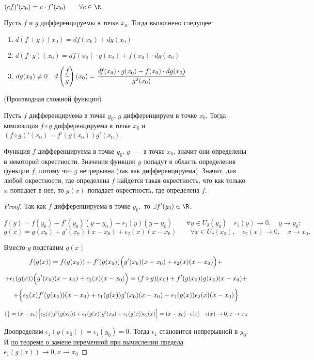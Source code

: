 \begin{corollary}
	$ (cf)'(x_{0}) = c\cdot f'(x_{0}) \quad \quad \forall c \in \R
	$
\end{corollary}
\begin{corollary}
	Пусть $f$ и $g$ дифференцируемы в точке $x_{0}$. Тогда выполнено следущее:
	\begin{enumerate}
		\item $  d(f \pm g)(x_{0}) = df(x_{0}) \pm dg({x_{0}}) $
		\item  $ d(f \cdot g)(x_{0}) = df(x_{0}) \cdot g({x_{0}}) + f(x_{0}) \cdot dg({x_{0}})$
		\item $dg(x_{0}) \neq 0 \quad d\left(\cfrac{f}{g}\right) (x_{0}) = \cfrac{df(x_{0}) \cdot g({x_{0}}) - f(x_{0}) \cdot dg({x_{0}})}{g^{2}(x_{0})}$
	\end{enumerate}
\end{corollary}
\begin{theorem}
	\hypertarget{thrm5.10}{(Производная сложной функции)} Пусть $f$ дифференцируема в точке $y_{0}$, $g$ дифференцируем в точке $x_{0}$. Тогда композиция $f \circ g$ дифференцируема в точке $x_{0} $ и $(f\circ g)'(x_{0}) = f'(g(x_{0})) g'(x_{0})$.
\end{theorem}
\begin{note}
	Функция $f$ дифференцируема в точке $y_{0}$, $g$~---~в точке $x_{0}$, значит они определены в некоторой окрестности. Значения функции $g$ попадут в область определения функции $f$, потому что $g$ непрерывна (так как дифференцируема). Значит, для любой окрестности, где определена $f$ найдется такая окрестность, что как только $x$ попадает в нее, то $g(x)$ попадает окрестность, где определена $f$.
\end{note}
\begin{proof}
	Так как $f$ дифференцируема в точке $y_{0},$ то $\exists f'(y_{0}) \in \R$.
	
	$$f(y) = f(y_{0}) + f'(y_{0})(y-y_{0}) + \epsilon_{1}(y)(y-y_{0}) \quad  \quad   \forall y \in U_{\delta}(y_{0}) \quad \epsilon_{1}(y) \to 0,\quad y\to y_{0};$$
	$$g(x) = g(x_{0}) + g'(x_{0})(x-x_{0}) + \epsilon_{2}(x)(x-x_{0})  \quad \quad  \forall x \in U_{\delta}(x_{0}),\quad \epsilon_{2}(x) \to 0,\quad  x\to x_{0}.$$
	
	Вместо $y$ подставим $g(x)$
	$$
	f(g(x)) = f(g(x_{0})) + f'(g(x_{0}))\Bigl( g'(x_{0})(x-x_{0}) + \epsilon_{2}(x)(x-x_{0})\Bigr) +  $$
	$$
	+ \epsilon_{1}(g(x))\Bigl(g'(x_{0})(x-x_{0}) + \epsilon_{2}(x)(x-x_{0})\Bigr) = (f\circ g)(x_{0}) + f'(g(x_{0}))g(x_{0})(x-x_{0}) + $$
	$$+ \Bigl\{ \epsilon_{2}(x)f'(g(x_{0}))(x-x_{0}) + \epsilon_{1}(g(x))g'(x_{0})(x-x_{0}) + \epsilon_{1}(g(x))\epsilon_{2}(x)(x-x_{0}) \Bigr\}$$
	
	$$
	\{\} = (x-x_{0})\Bigl[\epsilon_{2}(x)f'(g(x_{0})) + \epsilon_{1}(g(x))g'(x_{0}) + \epsilon_{1}(g(x))\epsilon_{2}(x) \Bigr] = (x - x_{0}) \cdot \epsilon(x) \quad \epsilon(x) \to 0, x\to x_{0}
	$$
	
	Доопределим $\epsilon_{1}(g(x_{0})) = \epsilon_{1}(y_{0}) = 0$. Тогда $\epsilon_{1}$ становится непрерывной в  $y_{0}.$ И \hyperlink{thrm4.18}{по теореме о замене переменной при вычислении предела} $\epsilon_{1}(g(x))\to 0, x\to x_{0}$
\end{proof}

